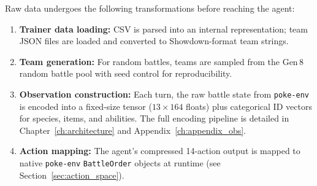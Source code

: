 Raw data undergoes the following transformations before reaching the agent:

\begin{enumerate}
  \item \textbf{Trainer data loading:} CSV is parsed into an internal
        representation; team JSON files are loaded and converted to
        Showdown-format team strings.
  \item \textbf{Team generation:} For random battles, teams are sampled from
        the Gen\,8 random battle pool with seed control for reproducibility.
  \item \textbf{Observation construction:} Each turn, the raw battle state
        from \texttt{poke-env} is encoded into a fixed-size tensor
        ($13 \times 164$ floats) plus categorical ID vectors for species,
        items, and abilities.  The full encoding pipeline is detailed in
        Chapter~\ref{ch:architecture} and Appendix~\ref{ch:appendix_obs}.
  \item \textbf{Action mapping:} The agent's compressed 14-action output is
        mapped to native \texttt{poke-env} \texttt{BattleOrder} objects at
        runtime (see Section~\ref{sec:action_space}).
\end{enumerate}

